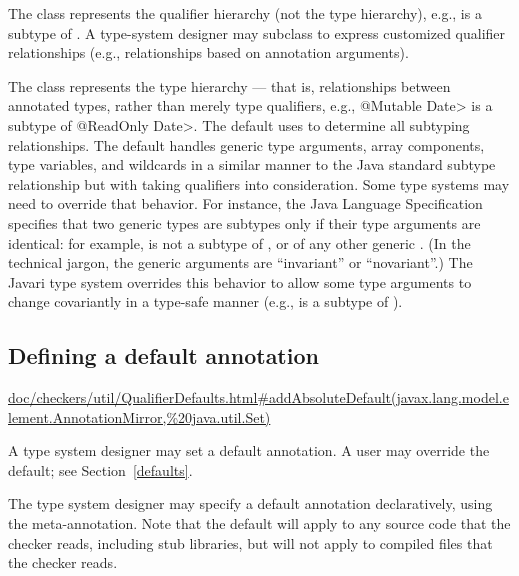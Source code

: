The  class represents the qualifier hierarchy (not the
type hierarchy), e.g., 
is a subtype of .  A type-system designer may subclass
 to express customized qualifier
relationships (e.g., relationships based on annotation
arguments).

The  class represents the type hierarchy ---
that is, relationships between
annotated types, rather than merely type qualifiers, e.g., \<@Mutable
Date> is a subtype of \<@ReadOnly Date>.  The default  uses
 to determine all subtyping relationships.
The default  handles
generic type arguments, array components, type variables, and
wildcards in a similar manner to the Java standard subtype
relationship but with taking qualifiers into consideration.  Some type
systems may need to override that behavior.  For instance, the Java
Language Specification specifies that two generic types are subtypes only
if their type arguments are identical:  for example,
 is not a subtype of , or of any other
generic .
(In the technical jargon, the generic arguments are ``invariant'' or ``novariant''.)
The Javari type system overrides this
behavior to allow some type arguments to change covariantly in a type-safe
manner (e.g.,
 is a subtype of ).


\subsection{Defining a default annotation\label{typesystem-defaults}}


\urldef{\addAbsoluteDefaultURL}\url{doc/checkers/util/QualifierDefaults.html#addAbsoluteDefault(javax.lang.model.element.AnnotationMirror,%20java.util.Set)}

A type system designer may set a default annotation.  A user may override
the default; see Section~\ref{defaults}.

The type system designer may specify a default annotation declaratively,
using the 
meta-annotation.
Note that the default will apply to any source code that the checker reads,
including stub libraries, but will not apply to compiled 
files that the checker reads.

